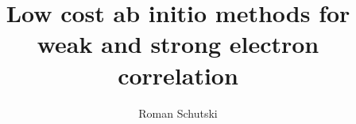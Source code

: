 \documentclass[12pt]{ruthesis}
\title{Low cost ab initio methods for weak and strong electron correlation}
\author{Roman Schutski}
\begin{document}
  \begin{frontmatter}
   \maketitle
   
   \tableofcontents
   \listoffigures
   \listoftables
%   
  \end{frontmatter}




\appendix

%
%
%
%

%

\end{document}
